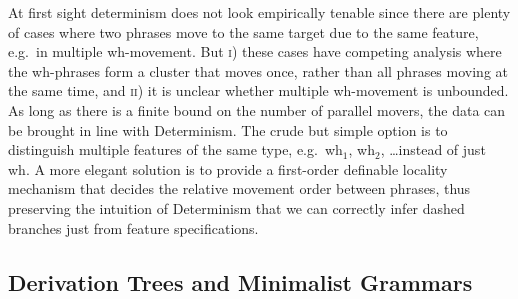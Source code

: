 At first sight determinism does not look empirically tenable since there are plenty of cases where two phrases move to the same target due to the same feature, e.g.\ in multiple wh-movement.
But \textsc{i}) these cases have competing analysis where the wh-phrases form a cluster that moves once, rather than all phrases moving at the same time, and \textsc{ii}) it is unclear whether multiple wh-movement is unbounded.
As long as there is a finite bound on the number of parallel movers, the data can be brought in line with Determinism.
The crude but simple option is to distinguish multiple features of the same type, e.g.\ wh$_1$, wh$_2$, \ldots instead of just wh.
A more elegant solution is to provide a first-order definable locality mechanism that decides the relative movement order between phrases, thus preserving the intuition of Determinism that we can correctly infer dashed branches just from feature specifications.

\subsection{Derivation Trees and Minimalist Grammars}

